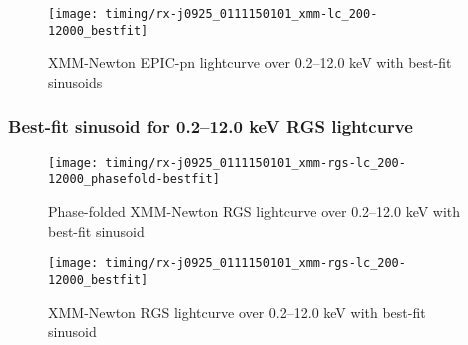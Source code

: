 				\begin{figure}[h!]
					\centering
					\texttt{[image: timing/rx-j0925\_0111150101\_xmm-lc\_200-12000\_bestfit]}
					\caption{XMM-Newton EPIC-pn lightcurve over 0.2--12.0 keV with best-fit sinusoids}
					\label{result:lc-mrvel-xmm:200-12000-bestfit}
				\end{figure}
				
			\subsubsection{Best-fit sinusoid for 0.2--12.0 keV RGS lightcurve}
				\begin{figure}[h!]
					\centering
					\texttt{[image: timing/rx-j0925\_0111150101\_xmm-rgs-lc\_200-12000\_phasefold-bestfit]}
					\caption{Phase-folded XMM-Newton RGS lightcurve over 0.2--12.0 keV with best-fit sinusoid}
					\label{result:lc-phase-fold-mrvel-xmm-rgs:200-12000-bestfit}
				\end{figure}
				
				\begin{figure}[h!]
					\centering
					\texttt{[image: timing/rx-j0925\_0111150101\_xmm-rgs-lc\_200-12000\_bestfit]}
					\caption{XMM-Newton RGS lightcurve over 0.2--12.0 keV with best-fit sinusoid}
					\label{result:lc-mrvel-xmm-rgs:200-12000-bestfit}
				\end{figure}
		
